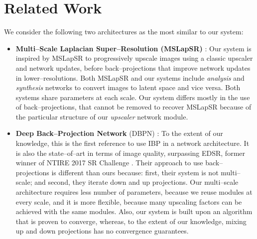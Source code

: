 \documentclass[letterpaper]{article}
\begin{document}
\section{Related Work}
\label{sec:related}
We consider the following two architectures as the most similar to our system:\pagebreak
\begin{itemize}
    \item \textbf{Multi--Scale Laplacian Super--Resolution (MSLapSR)} \cite{MSLapSRN}: Our system is inspired by MSLapSR to progressively upscale images using a classic upscaler and network updates, before back--projections that improve network updates in lower--resolutions. Both MSLapSR and our systems include \emph{analysis} and \emph{synthesis} networks to convert images to latent space and vice versa. Both systems share parameters at each scale. Our system differs mostly in the use of back--projections, that cannot be removed to recover MSLapSR because of the particular structure of our \emph{upscaler} network module.
    \item \textbf{Deep Back--Projection Network} (DBPN) \cite{DBPN2018}: To the extent of our knowledge, this is the first reference to use IBP in a network architecture. It is also the state--of--art in terms of image quality, surpassing EDSR\cite{Lim_2017_CVPR_Workshops}, former winner of NTIRE 2017 SR Challenge \cite{Timofte_2017_CVPR_Workshops}. Their approach to use back--projections is different than ours because: first, their system is not multi--scale; and second, they iterate down and up projections. Our multi--scale architecture requires less number of parameters, because we reuse modules at every scale, and it is more flexible, because many upscaling factors can be achieved with the same modules. Also, our system is built upon an algorithm that is proven to converge, whereas, to the extent of our knowledge, mixing up and down projections has no convergence guarantees.
\end{itemize}
\end{document}
